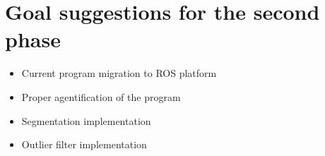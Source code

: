 \documentclass[paper=a4, fontsize=12pt]{scrartcl} %
\numberwithin{equation}{section} %
\numberwithin{figure}{section} %
\numberwithin{table}{section} %
\begin{document}
\section{Goal suggestions for the second phase}

\begin{itemize}
  \item Current program migration to ROS platform
  \item Proper agentification of the program
  \item Segmentation implementation
  \item Outlier filter implementation
\end{itemize}






\end{document}
